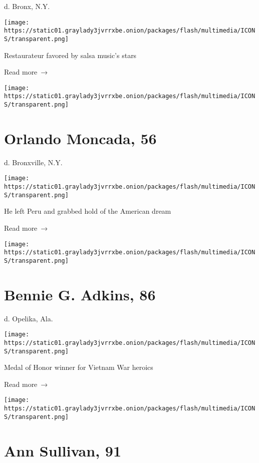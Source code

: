 d. Bronx, N.Y.

\texttt{[image: https://static01.graylady3jvrrxbe.onion/packages/flash/multimedia/ICONS/transparent.png]}

Restaurateur favored by salsa music's stars

 Read more~→

\href{https://www.nytimes3xbfgragh.onion/2020/04/22/obituaries/orlando-moncada-dead-coronavirus.html}{}

\texttt{[image: https://static01.graylady3jvrrxbe.onion/packages/flash/multimedia/ICONS/transparent.png]}

\hypertarget{orlando-moncada-56}{%
\section{Orlando Moncada, 56}\label{orlando-moncada-56}}

d. Bronxville, N.Y.

\texttt{[image: https://static01.graylady3jvrrxbe.onion/packages/flash/multimedia/ICONS/transparent.png]}

He left Peru and grabbed hold of the American dream

 Read more~→

\href{https://www.nytimes3xbfgragh.onion/2020/04/22/obituaries/bennie-g-adkins-dead-coronavirus.html}{}

\texttt{[image: https://static01.graylady3jvrrxbe.onion/packages/flash/multimedia/ICONS/transparent.png]}

\hypertarget{bennie-g-adkins-86}{%
\section{Bennie G. Adkins, 86}\label{bennie-g-adkins-86}}

d. Opelika, Ala.

\texttt{[image: https://static01.graylady3jvrrxbe.onion/packages/flash/multimedia/ICONS/transparent.png]}

Medal of Honor winner for Vietnam War heroics

 Read more~→

\href{https://www.nytimes3xbfgragh.onion/2020/04/21/movies/ann-sullivan-dead-coronavirus.html}{}

\texttt{[image: https://static01.graylady3jvrrxbe.onion/packages/flash/multimedia/ICONS/transparent.png]}

\hypertarget{ann-sullivan-91}{%
\section{Ann Sullivan, 91}\label{ann-sullivan-91}}

